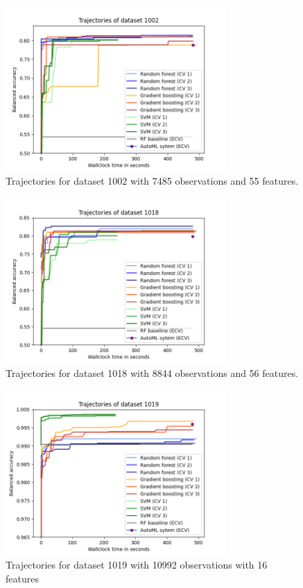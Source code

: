 \documentclass[11pt]{article}
\begin{document}
\begin{figure}[H]
 \centering
  \includegraphics[width=0.75\textwidth]{fig/plot_dataset_1002.png}
  \caption{Trajectories for dataset 1002 with 7485 observations and 55 features.}
\end{figure}

\begin{figure}[H]
 \centering
  \includegraphics[width=0.75\textwidth]{fig/plot_dataset_1018.png}
  \caption{Trajectories for dataset 1018 with 8844 observations and 56 features.}
\end{figure}

\begin{figure}[H]
 \centering
  \includegraphics[width=0.75\textwidth]{fig/plot_dataset_1019.png}
  \caption{Trajectories for dataset 1019 with 10992 observations with 16 features}
\end{figure}
\end{document}
